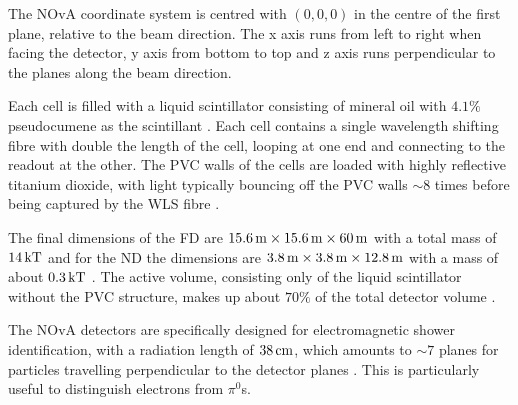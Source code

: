 The \gls{NOvA} coordinate system is centred with $\left(0,0,0\right)$ in the centre of the first plane, relative to the beam direction. The x axis runs from left to right when facing the detector, y axis from bottom to top and z axis runs perpendicular to the planes along the beam direction.

Each cell is filled with a liquid scintillator consisting of mineral oil with $4.1\%$ pseudocumene as the scintillant \cite{NOvAScintillators.pdf}. Each cell contains a single wavelength shifting fibre with double the length of the cell, looping at one end and connecting to the readout at the other. The \gls{PVC} walls of the cells are loaded with highly reflective titanium dioxide, with light typically bouncing off the \gls{PVC} walls $\sim8$ times before being captured by the \gls{WLS} fibre \cite{NOvATechreport.pdf}.

The final dimensions of the \gls{FD} are $\unit[15.6]{m}\times\unit[15.6]{m}\times\unit[60]{m}$ with a total mass of $\unit[14]{kT}$ and for the \gls{ND} the dimensions are $\unit[3.8]{m}\times\unit[3.8]{m}\times\unit[12.8]{m}$ with a mass of about $\unit[0.3]{kT}$ \cite{NOvAHalfTimeOverview2022.pdf}. The active volume, consisting only of the liquid scintillator without the \gls{PVC} structure, makes up about $70\%$ of the total detector volume \cite{NOvATechreport.pdf}.

The \gls{NOvA} detectors are specifically designed for electromagnetic shower identification, with a radiation length of $\unit[38]{cm}$, which amounts to $\sim 7$ planes for particles travelling perpendicular to the detector planes \cite{NOvAStatusAndOutlook.pdf}. This is particularly useful to distinguish electrons from $\pi^0$s.

